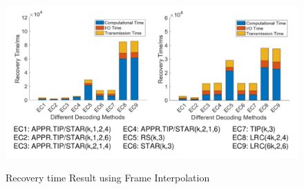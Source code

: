 \documentclass[sigconf]{acmart}
\begin{document}

\begin{figure}[ht]
\centering
\includegraphics[width=\linewidth]{photo/experiment/Recovery-2-3.pdf}\label{fig-rec-3}
\caption{Recovery time Result using Frame Interpolation}
\label{fig-recoverytime}
\end{figure}
\end{document}
